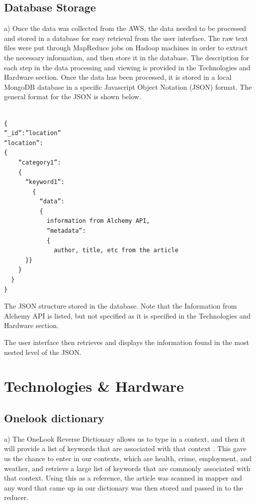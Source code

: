 \documentclass[conference]{IEEEtran}
\begin{document}
\subsection{Database Storage}
a)  Once the data was collected from the AWS, the data needed to be processed and stored in a database for easy retrieval from the user interface. The raw text files were put through MapReduce jobs on Hadoop machines in order to extract the necessary information, and then store it in the database. The description for each step in the data processing and viewing is provided in the Technologies and Hardware section. Once the data has been processed, it is stored in a local MongoDB database in a specific Javascript Object Notation (JSON) format. The general format for the JSON is shown below.

\begingroup
    \fontsize{8pt}{10pt}
\begin{verbatim} 

{
“_id”:”location” 
“location”: 
{ 
    “category1”:
    {
      “keyword1”: 
        {
          “data”: 
          { 
            information from Alchemy API, 
            “metadata”: 
            { 
              author, title, etc from the article
      }}
    }
  }
}

\end{verbatim}
\endgroup

The JSON structure stored in the database. Note that the Information from Alchemy API is listed, but not specified as it is specified in the Technologies and Hardware section. 

The user interface then retrieves and displays the information found in the most nested level of the JSON. 


\section{Technologies \& Hardware}

\subsection{Onelook dictionary}

a)  The OneLook Reverse Dictionary allows us to type in a context, and then it will provide a list of keywords that are associated with that context \cite{beeferman:onelook}. This gave us the chance to enter in our contexts, which are health, crime, employment, and weather, and retrieve a large list of keywords that are commonly associated with that context. Using this as a reference, the article was scanned in mapper and any word that came up in our dictionary was then stored and passed in to the reducer.
\end{document}
